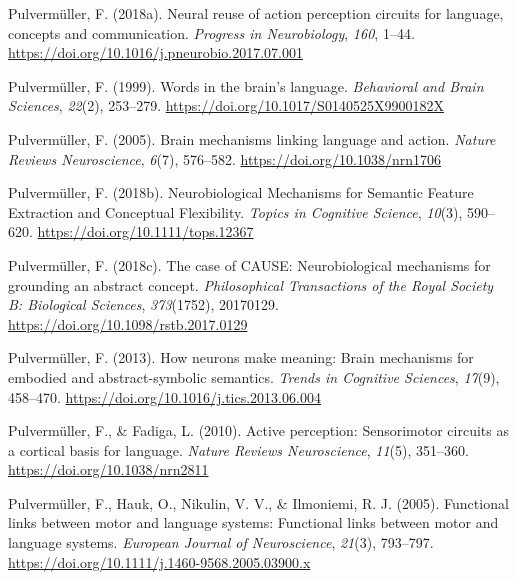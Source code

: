 \documentclass[
  a4paper,12pt,twoside,onecolumn,openright,final,oldfontcommands]{memoir}
\newlength{\cslhangindent}
\newlength{\cslentryspacingunit} %
\newenvironment{CSLReferences}[2] %
 {%
  \setlength{\parindent}{0pt}
  \ifodd #1
  \let\oldpar\par
  \def\par{\hangindent=\cslhangindent\oldpar}
  \fi
  \setlength{\parskip}{#2\cslentryspacingunit}
 }%
 {}
\begin{document}
\begin{CSLReferences}{1}{0}
\leavevmode{}%
Pulvermüller, F. (2018a). Neural reuse of action perception circuits for language, concepts and communication. \emph{Progress in Neurobiology}, \emph{160}, 1--44. \url{https://doi.org/10.1016/j.pneurobio.2017.07.001}

\leavevmode{}%
Pulvermüller, F. (1999). Words in the brain's language. \emph{Behavioral and Brain Sciences}, \emph{22}(2), 253--279. \url{https://doi.org/10.1017/S0140525X9900182X}

\leavevmode{}%
Pulvermüller, F. (2005). Brain mechanisms linking language and action. \emph{Nature Reviews Neuroscience}, \emph{6}(7), 576--582. \url{https://doi.org/10.1038/nrn1706}

\leavevmode{}%
Pulvermüller, F. (2018b). Neurobiological {Mechanisms} for {Semantic} {Feature} {Extraction} and {Conceptual} {Flexibility}. \emph{Topics in Cognitive Science}, \emph{10}(3), 590--620. \url{https://doi.org/10.1111/tops.12367}

\leavevmode{}%
Pulvermüller, F. (2018c). The case of {CAUSE}: Neurobiological mechanisms for grounding an abstract concept. \emph{Philosophical Transactions of the Royal Society B: Biological Sciences}, \emph{373}(1752), 20170129. \url{https://doi.org/10.1098/rstb.2017.0129}

\leavevmode{}%
Pulvermüller, F. (2013). How neurons make meaning: Brain mechanisms for embodied and abstract-symbolic semantics. \emph{Trends in Cognitive Sciences}, \emph{17}(9), 458--470. \url{https://doi.org/10.1016/j.tics.2013.06.004}

\leavevmode{}%
Pulvermüller, F., \& Fadiga, L. (2010). Active perception: Sensorimotor circuits as a cortical basis for language. \emph{Nature Reviews Neuroscience}, \emph{11}(5), 351--360. \url{https://doi.org/10.1038/nrn2811}

\leavevmode{}%
Pulvermüller, F., Hauk, O., Nikulin, V. V., \& Ilmoniemi, R. J. (2005). Functional links between motor and language systems: {Functional} links between motor and language systems. \emph{European Journal of Neuroscience}, \emph{21}(3), 793--797. \url{https://doi.org/10.1111/j.1460-9568.2005.03900.x}


\end{CSLReferences}
\end{document}
